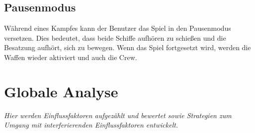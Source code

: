 \documentclass[fontsize=12pt,paper=a4,twoside]{scrartcl}
\begin{document}
\subsection{Pausenmodus}
Während eines Kampfes kann der Benutzer das Spiel in den Pausenmodus versetzen. Dies bedeutet, dass beide Schiffe aufhören zu schießen und die Besatzung aufhört, sich zu bewegen. Wenn das Spiel fortgesetzt wird, werden die Waffen wieder aktiviert und auch die Crew.
\section{Globale Analyse} \label{sec:globale_analyse}

{\itshape Hier werden Einflussfaktoren aufgezählt und bewertet sowie Strategien
zum Umgang mit interferierenden Einflussfaktoren entwickelt.}
\end{document}
